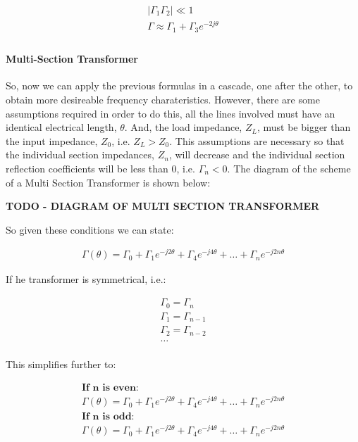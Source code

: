 \documentclass[colorlinks,11pt,a4paper,normalphoto,withhyper,ragged2e]{altareport}
\begin{document}
\begin{gather*}
	| \Gamma_1 \Gamma_2 | \ll 1 \\
	\Gamma \approx \Gamma_1 + \Gamma_3 e^{-2j\theta} \\
\end{gather*}




\paragraph{Multi-Section Transformer}
So, now we can apply the previous formulas in a cascade, one after the other, to obtain more desireable frequency charateristics. However, there are some assumptions  required in order to do this, all the lines involved must have an identical electrical length, $\theta$. And, the load impedance, $Z_L$, must be bigger than the input impedance, $Z_0$, i.e. $Z_L > Z_0$. This assumptions are necessary so that the individual section impedances, $Z_n$, will decrease and the individual section reflection coefficients will be less than 0, i.e. $\Gamma_n < 0$. The diagram of the scheme of a Multi Section Transformer is shown below: \linebreak


\textbf{TODO - DIAGRAM OF MULTI SECTION TRANSFORMER} \linebreak

So given these conditions we can state: \linebreak 

\begin{gather*}
	\Gamma(\theta) = \Gamma_0 + \Gamma_1 e^{-j2\theta} + \Gamma_4 e^{-j4\theta} + \dots + \Gamma_n e^{-j2n\theta}
\end{gather*}


If he transformer is symmetrical, i.e.: \linebreak

\begin{gather*}
	\Gamma_0 = \Gamma_n \\
	\Gamma_1 = \Gamma_{n-1} \\
	\Gamma_2 = \Gamma_{n-2} \\
	\dots \\
\end{gather*}



This simplifies further to:

\begin{gather*}
	\textbf{If n is even:} \\
	\Gamma(\theta) = \Gamma_0 + \Gamma_1 e^{-j2\theta} + \Gamma_4 e^{-j4\theta} + \dots + \Gamma_n e^{-j2n\theta} \\
	\textbf{If n is odd:} \\
	\Gamma(\theta) = \Gamma_0 + \Gamma_1 e^{-j2\theta} + \Gamma_4 e^{-j4\theta} + \dots + \Gamma_n e^{-j2n\theta} \\
\end{gather*}
\end{document}
